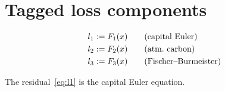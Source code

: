 \section{Tagged loss components}

\begin{align}
l_1 &:= F_1(x) \tag*{\text{(capital Euler)}}\label{eq:l1}\\
l_2 &:= F_2(x) \tag*{\text{(atm.\ carbon)}}\label{eq:l2}\\
l_3 &:= F_3(x) \tag*{\text{(Fischer--Burmeister)}}\label{eq:l3}
\end{align}

The residual~\eqref{eq:l1} is the capital Euler equation.
